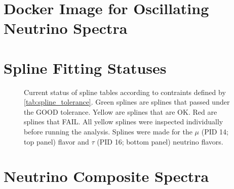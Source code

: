 \chapter{Docker Image for Oscillating Neutrino Spectra}\label{sec:apdx_nu_spec}


\clearpage

\chapter{Spline Fitting Statuses} \label{sec:apdx_nu_splines}

\begin{figure}[ht]
    \caption{Current status of spline tables according to contraints defined by \cref{tab:spline_tolerance}. Green splines are splines that passed under the GOOD tolerance. Yellow are splines that are OK. Red are splines that FAIL. All yellow splines were inspected individually before running the analysis. Splines were made for the $\mu$ (PID 14; top panel) flavor and $\tau$ (PID 16; bottom panel) neutrino flavors.}
    \label{fig:apdx_nu_splines}
\end{figure}

\clearpage

\chapter{Neutrino Composite Spectra} \label{sec:apdx_final_specs}

